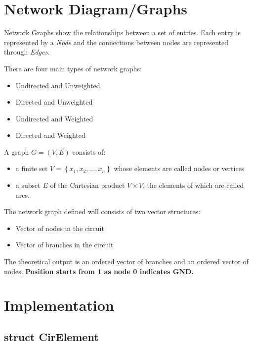 \documentclass[a4paper, titlepage]{article}
\begin{document}
    \section{Network Diagram/Graphs}
    Network Graphs show the relationships between a set of entries. Each entry is represented by a \textit{Node} and the connections between nodes are represented through \textit{Edges}.
    \par
    There are four main types of network graphs:
    \begin{itemize}
        \item Undirected and Unweighted
        \item Directed and Unweighted
        \item Undirected and Weighted
        \item Directed and Weighted
    \end{itemize}
    \par
    A graph $G=(V, E)$ consists of: \cite{parse}  %
    \begin{itemize}
        \item a finite set $V = \left\{ x_1, x_2, \dots, x_n \right \}$ whose elements are called nodes or vertices %
        \item a subset $E$ of the Cartesian product $V \times V$, the elements of which are called arcs. %
    \end{itemize}
    The network graph defined will consists of two vector structures:
    \begin{itemize}
        \item Vector of nodes in the circuit
        \item Vector of branches in the circuit
    \end{itemize}
    The theoretical output is an ordered vector of branches and an ordered vector of nodes. 
    \textbf{Position starts from 1 as node 0 indicates GND.}

    \section{Implementation}
    \subsection{struct CirElement}
    
\end{document}
